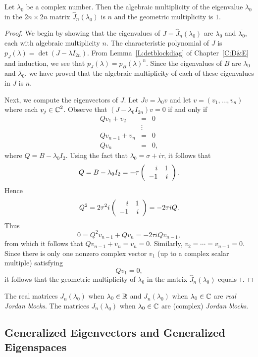 \documentclass{ximera}
\begin{document}
\begin{lemma}
Let $\lambda_0$ be a complex number.  Then the algebraic multiplicity
of the eigenvalue $\lambda_0$ in the $2n\times 2n$ matrix
$\widehat{J}_n(\lambda_0)$ is $n$ and the geometric multiplicity is $1$.
\end{lemma}

\begin{proof} We begin by showing that the eigenvalues of
$J=\widehat{J}_n(\lambda_0)$ are $\lambda_0$ and $\overline{\lambda_0}$, each 
with algebraic multiplicity $n$.  The characteristic polynomial of $J$ is 
$p_J(\lambda)=\det(J-\lambda I_{2n})$.  From Lemma~\ref{L:detblockdiag} of 
Chapter~\ref{C:D&E} and induction, we see that $p_J(\lambda)=p_B(\lambda)^n$. 
Since the eigenvalues of $B$ are $\lambda_0$ and $\overline{\lambda_0}$, we
have proved that the algebraic multiplicity of each of these eigenvalues in 
$J$ is $n$.
   
Next, we compute the eigenvectors of $J$.  Let $Jv=\lambda_0v$ 
and let $v=(v_1,\ldots,v_n)$ where each $v_j\in\mbox{$\Bbb{C}$}^2$.  Observe that 
$(J-\lambda_0I_{2n})v=0$ if and only if
\begin{eqnarray*}
Qv_1 + v_2 & = & 0 \\
& \vdots & \\
Qv_{n-1} + v_n & = & 0 \\
Qv_n & = & 0,
\end{eqnarray*}
where $Q=B-\lambda_0I_2$.
Using the fact that $\lambda_0=\sigma+i\tau$, it follows that 
\[
Q=B-\lambda_0I_2 = -\tau\left(\begin{array}{rr} i & 1\\ -1 &i\end{array}\right).
\]
Hence
\[
Q^2 = 2\tau^2i\left(\begin{array}{rr} i & 1\\ -1 &i\end{array}\right)=-2\tau iQ.
\]
Thus
\[
0 = Q^2v_{n-1} + Qv_n
= -2\tau iQv_{n-1},
\]
from which it follows that $Qv_{n-1}+v_n = v_n = 0$.  Similarly, 
$v_2=\cdots=v_{n-1}=0$.  Since there is only one nonzero complex vector 
$v_1$ (up to a complex scalar multiple) satisfying
\[
Qv_1 = 0,
\]
it follows that the geometric multiplicity of $\lambda_0$ in the matrix
$\widehat{J}_n(\lambda_0)$ equals $1$.  \end{proof}

\begin{definition}  \label{D:jordanblock}
The real matrices $J_n(\lambda_0)$ when $\lambda_0\in\mbox{$\Bbb{R}$}$ and 
$\widehat{J}_n(\lambda_0)$ when $\lambda_0\in\mbox{$\Bbb{C}$}$ are {\em real Jordan
blocks\/}.  The matrices $J_n(\lambda_0)$ when $\lambda_0\in\mbox{$\Bbb{C}$}$ are (complex)
{\em Jordan blocks\/}.
\end{definition} 

\subsection*{Generalized Eigenvectors and Generalized Eigenspaces}
\end{document}

